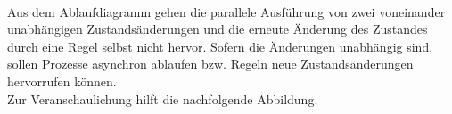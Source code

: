         \\
        Aus dem Ablaufdiagramm gehen die parallele Ausführung von zwei voneinander unabhängigen Zustandsänderungen und die 
        erneute Änderung des Zustandes durch eine Regel selbst nicht hervor. Sofern die Änderungen unabhängig 
        sind, sollen Prozesse asynchron ablaufen bzw. Regeln neue Zustandsänderungen hervorrufen können. 
        \\
        Zur Veranschaulichung hilft die nachfolgende Abbildung. 
        